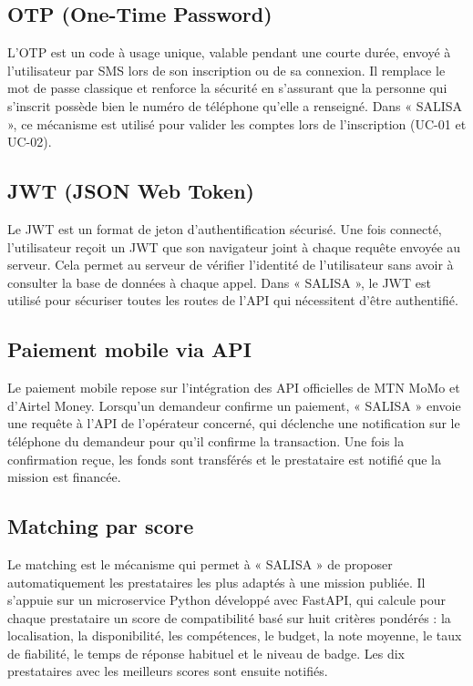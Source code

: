 \subsection*{\textcolor{vertCongo}{OTP (One-Time Password)}}

L'OTP est un code à usage unique, valable pendant une courte durée, envoyé à l'utilisateur par SMS lors de son inscription ou de sa connexion. Il remplace le mot de passe classique et renforce la sécurité en s'assurant que la personne qui s'inscrit possède bien le numéro de téléphone qu'elle a renseigné. Dans « SALISA », ce mécanisme est utilisé pour valider les comptes lors de l'inscription (UC-01 et UC-02).

\subsection*{\textcolor{vertCongo}{JWT (JSON Web Token)}}

Le JWT est un format de jeton d'authentification sécurisé. Une fois connecté, l'utilisateur reçoit un JWT que son navigateur joint à chaque requête envoyée au serveur. Cela permet au serveur de vérifier l'identité de l'utilisateur sans avoir à consulter la base de données à chaque appel. Dans « SALISA », le JWT est utilisé pour sécuriser toutes les routes de l'API qui nécessitent d'être authentifié.

\subsection*{\textcolor{vertCongo}{Paiement mobile via API}}

Le paiement mobile repose sur l'intégration des API officielles de MTN MoMo et d'Airtel Money. Lorsqu'un demandeur confirme un paiement, « SALISA » envoie une requête à l'API de l'opérateur concerné, qui déclenche une notification sur le téléphone du demandeur pour qu'il confirme la transaction. Une fois la confirmation reçue, les fonds sont transférés et le prestataire est notifié que la mission est financée.

\subsection*{\textcolor{vertCongo}{Matching par score}}

Le matching est le mécanisme qui permet à « SALISA » de proposer automatiquement les prestataires les plus adaptés à une mission publiée. Il s'appuie sur un microservice Python développé avec FastAPI, qui calcule pour chaque prestataire un score de compatibilité basé sur huit critères pondérés : la localisation, la disponibilité, les compétences, le budget, la note moyenne, le taux de fiabilité, le temps de réponse habituel et le niveau de badge. Les dix prestataires avec les meilleurs scores sont ensuite notifiés.

